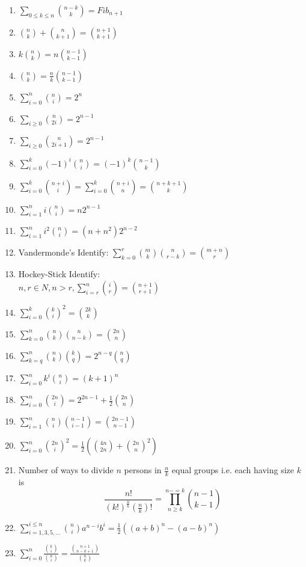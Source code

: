 \begin{enumerate}
  \item $\sum_{0 \le k \le n} \binom{n-k}{k} = Fib_{n+1}$
  \item $\binom{n}{k} + \binom{n}{k+1} = \binom{n+1}{k+1}$
  \item $k\binom{n}{k} = n\binom{n-1}{k-1}$
  \item $\binom{n}{k} = \frac{n}{k}\binom{n-1}{k-1}$
  \item $\sum_{i=0}^{n} \binom{n}{i} = 2^n$
  \item $\sum_{i \ge 0} \binom{n}{2i} = 2^{n-1}$
  \item $\sum_{i \ge 0} \binom{n}{2i+1} = 2^{n-1}$
  \item $\sum_{i=0}^{k} (-1)^i \binom{n}{i} = (-1)^k \binom{n-1}{k}$
  \item $\sum_{i=0}^{k} \binom{n+i}{i} = \sum_{i=0}^{k} \binom{n+i}{n} = \binom{n+k+1}{k}$
  \item $\sum_{i=1}^{n} i\binom{n}{i} = n2^{n-1}$
  \item $\sum_{i=1}^{n} i^2\binom{n}{i} = (n + n^2)2^{n-2}$
  \item Vandermonde's Identify: $\sum_{k=0}^{r} \binom{m}{k}\binom{n}{r-k} = \binom{m+n}{r}$
  \item Hockey-Stick Identify: \\
  $n, r \in N, n > r, \sum_{i=r}^{n} \binom{i}{r} = \binom{n+1}{r+1}$
  \item $\sum_{i=0}^{k} \binom{k}{i}^2 = \binom{2k}{k}$
  \item $\sum_{k=0}^{n} \binom{n}{k}\binom{n}{n-k} = \binom{2n}{n}$
  \item $\sum_{k=q}^{n} \binom{n}{k}\binom{k}{q} = 2^{n-q}\binom{n}{q}$
  \item $\sum_{i=0}^{n} k^i\binom{n}{i} = (k+1)^n$
  \item $\sum_{i=0}^{n} \binom{2n}{i} = 2^{2n-1} + \frac{1}{2}\binom{2n}{n}$
  \item $\sum_{i=1}^{n} \binom{n}{i}\binom{n-1}{i-1} = \binom{2n-1}{n-1}$
  \item $\sum_{i=0}^{n} \binom{2n}{i}^2 = \frac{1}{2} \left( \binom{4n}{2n} + \binom{2n}{n}^2 \right)$
  \item Number of ways to divide $n$ persons in $\frac{n}{k}$ equal groups i.e. each having size $k$ is\\
  $$\frac{n!}{(k!)^{\frac{n}{k}} (\frac{n}{k})!} = \prod_{n \ge k}^{n -= k} \binom{n-1}{k-1}$$
  \item $\sum_{i=1,3,5,\dots}^{i \le n} \binom{n}{i} a^{n-i} b^i = \frac{1}{2}((a+b)^n - (a-b)^n)$
  \item $\sum_{i=0}^{n} \frac{\binom{k}{i}}{\binom{n}{i}} = \frac{\binom{n+1}{n-k+1}}{\binom{n}{k}}$
\end{enumerate}

